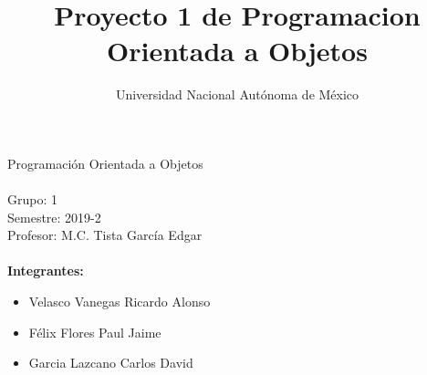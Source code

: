 \documentclass{article}
\title{Proyecto 1 de Programacion Orientada a Objetos}
\author{Universidad Nacional Autónoma de México}
\begin{document}

	\maketitle

	\huge Programación Orientada a Objetos
	\\
	\\
	\large Grupo: 1
	\\
	Semestre: 2019-2
	\\
	Profesor: M.C. Tista García Edgar
	\\
	\\
	\textbf{Integrantes:}

	\begin{itemize}
		\item Velasco Vanegas Ricardo Alonso
		\item Félix Flores Paul Jaime
		\item Garcia Lazcano Carlos David
	\end{itemize}
	
\end{document}
